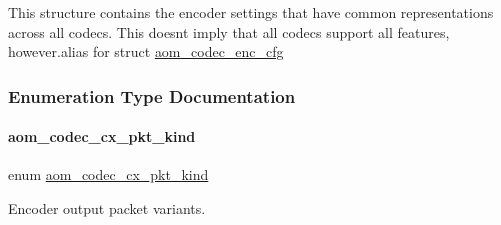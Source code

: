 This structure contains the encoder settings that have common representations across all codecs. This doesn\textquotesingle{}t imply that all codecs support all features, however.\+alias for struct \hyperlink{structaom__codec__enc__cfg}{aom\+\_\+codec\+\_\+enc\+\_\+cfg} 

\subsubsection{Enumeration Type Documentation}
\mbox{\label{group__encoder_gafeb69da4a9649a54e805f59c26d8dfed}} 
\paragraph{\texorpdfstring{aom\+\_\+codec\+\_\+cx\+\_\+pkt\+\_\+kind}{aom\_codec\_cx\_pkt\_kind}}
{\footnotesize\ttfamily enum \hyperlink{group__encoder_gafeb69da4a9649a54e805f59c26d8dfed}{aom\+\_\+codec\+\_\+cx\+\_\+pkt\+\_\+kind}}



Encoder output packet variants. 


